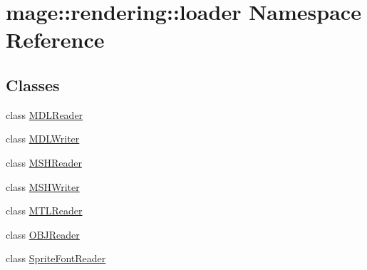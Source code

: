 \hypertarget{namespacemage_1_1rendering_1_1loader}{}\section{mage\+:\+:rendering\+:\+:loader Namespace Reference}
\label{namespacemage_1_1rendering_1_1loader}
\subsection*{Classes}
\begin{DoxyCompactItemize}
\item 
class \mbox{\hyperlink{classmage_1_1rendering_1_1loader_1_1_m_d_l_reader}{M\+D\+L\+Reader}}
\item 
class \mbox{\hyperlink{classmage_1_1rendering_1_1loader_1_1_m_d_l_writer}{M\+D\+L\+Writer}}
\item 
class \mbox{\hyperlink{classmage_1_1rendering_1_1loader_1_1_m_s_h_reader}{M\+S\+H\+Reader}}
\item 
class \mbox{\hyperlink{classmage_1_1rendering_1_1loader_1_1_m_s_h_writer}{M\+S\+H\+Writer}}
\item 
class \mbox{\hyperlink{classmage_1_1rendering_1_1loader_1_1_m_t_l_reader}{M\+T\+L\+Reader}}
\item 
class \mbox{\hyperlink{classmage_1_1rendering_1_1loader_1_1_o_b_j_reader}{O\+B\+J\+Reader}}
\item 
class \mbox{\hyperlink{classmage_1_1rendering_1_1loader_1_1_sprite_font_reader}{Sprite\+Font\+Reader}}
\end{DoxyCompactItemize}
